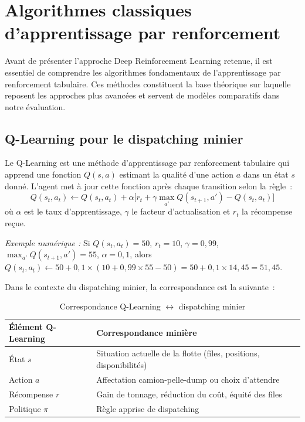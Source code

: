 \documentclass[11pt,a4paper]{report}
\begin{document}
\section{Algorithmes classiques d'apprentissage par renforcement}
\label{sec:algo-classiques-rl}
Avant de présenter l'approche Deep Reinforcement Learning retenue, il est essentiel de comprendre les algorithmes fondamentaux de l'apprentissage par renforcement tabulaire. Ces méthodes constituent la base théorique sur laquelle reposent les approches plus avancées et servent de modèles comparatifs dans notre évaluation.

\subsection{Q-Learning pour le dispatching minier}
\label{sec:q-learning}
Le Q-Learning est une méthode d'apprentissage par renforcement tabulaire qui apprend une fonction $Q(s, a)$ estimant la qualité d'une action $a$ dans un état $s$ donné. L'agent met à jour cette fonction après chaque transition selon la règle~:
\begin{equation}
    Q(s_t, a_t) \leftarrow Q(s_t, a_t) + \alpha \Big[ r_t + \gamma \max_{a'} Q(s_{t+1}, a') - Q(s_t, a_t) \Big]
    \label{eq:q-learning}
\end{equation}
où $\alpha$ est le taux d'apprentissage, $\gamma$ le facteur d'actualisation et $r_t$ la récompense reçue.

\textit{Exemple numérique :} Si $Q(s_t, a_t) = 50$, $r_t = 10$, $\gamma = 0{,}99$, $\max_{a'} Q(s_{t+1}, a') = 55$, $\alpha = 0{,}1$, alors $Q(s_t, a_t) \leftarrow 50 + 0{,}1 \times (10 + 0{,}99 \times 55 - 50) = 50 + 0{,}1 \times 14{,}45 = 51{,}45$.

Dans le contexte du dispatching minier, la correspondance est la suivante~:

\begin{table}[H]
\centering
\caption{Correspondance Q-Learning $\leftrightarrow$ dispatching minier}
\label{tab:q-learning-mine}
\begin{tabular}{lp{9cm}}
\toprule
\textbf{Élément Q-Learning} & \textbf{Correspondance minière} \\
\midrule
État $s$ & Situation actuelle de la flotte (files, positions, disponibilités) \\
Action $a$ & Affectation camion-pelle-dump ou choix d'attendre \\
Récompense $r$ & Gain de tonnage, réduction du coût, équité des files \\
Politique $\pi$ & Règle apprise de dispatching \\
\bottomrule
\end{tabular}
\end{table}
\end{document}
